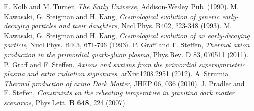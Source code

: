 \documentclass[preprint,notoc]{JHEP3}
\begin{document}
%
\begin{thebibliography}{99}
%
 E. Kolb and M. Turner, {\it The Early Universe}, Addison-Wesley Pub. (1990).
%
 M. Kawasaki, G. Steigman and H. Kang, {\it Cosmological evolution of generic early-decaying
particles and their daughters}, Nucl.Phys. B402, 323-348 (1993).
%
 M. Kawasaki, G. Steigman and H. Kang, {\it Cosmological evolution of an early-decaying particle}, Nucl.Phys. B403, 671-706 (1993).
%
 P. Graff and F. Steffen, {\it Thermal axion production in the primordial quark-gluon plasma}, Phys.Rev. D 83, 070511 (2011).
%
 P. Graff and F. Steffen, {\it Axions and saxions from the primordial supersymmetric plasma and extra radiation signatures}, arXiv:1208.2951 (2012).
%
 A. Strumia, {\it Thermal production of axino Dark Matter}, JHEP 06, 036 (2010).
%
 J. Pradler and F. Steffen, {\it Constraints on the reheating temperature in gravitino dark matter scenarios}, Phys.Lett. {\bf B 648}, 224 (2007).
%
\end{thebibliography}
\end{document}
